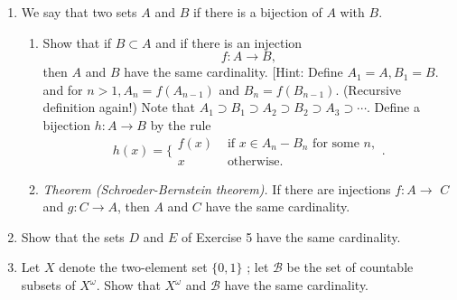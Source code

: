 \begin{enumerate}[itemsep=0.4em, parsep=0pt, topsep=0pt, partopsep=0pt, leftmargin=*, label=\arabic*., ref=\arabic*]
\begin{enumerate}[itemsep=0.2em, parsep=0pt, topsep=0pt, partopsep=0pt, leftmargin=*, label=(\alph*), align=left]
  \item The set \(E\) of all functions \(f : \mathbb{Z}_{+} \rightarrow \{ 0,1\}\).
  \item The set \(F\) of all functions \(f : \mathbb{Z}_{+} \rightarrow \{ 0,1\}\) that are ``.'' [We say that \(f\) is eventually zero if there is a positive integer \(N\) such that \(f(n) = 0\) for all \(n \geq N\). ]
  \item The set \(G\) of all functions \(f : \mathbb{Z}_{+} \rightarrow {\mathbb{Z}}_{+}\) that are eventually 1 .
  \item The set \(H\) of all functions \(f : \mathbb{Z}_{+} \rightarrow {\mathbb{Z}}_{+}\) that are eventually constant.
  \item The set \(I\) of all two-element subsets of \(\mathbb{Z}_{+}\).
  \item The set \(J\) of all finite subsets of \(\mathbb{Z}_{+}\).
  \end{enumerate}
\item We say that two sets \(A\) and \(B\)  if there is a bijection of \(A\) with \(B\).
  \begin{enumerate}[itemsep=0.2em, parsep=0pt, topsep=0pt, partopsep=0pt, leftmargin=*, label=(\alph*), align=left]
  \item Show that if \(B \subset A\) and if there is an injection \[ f : A \rightarrow B, \] then \(A\) and \(B\) have the same cardinality. [Hint: Define \(A_{1} = A,B_{1} = B\). and for \(n > 1,A_{n} = f(A_{n - 1})\) and \(B_{n} = f(B_{n - 1})\). (Recursive definition again!) Note that \(A_{1} \supset {B}_{1} \supset {A}_{2} \supset {B}_{2} \supset {A}_{3} \supset \cdots\). Define a bijection \(h : A \rightarrow B\) by the rule \[ h(x) = \{ \begin{array}{ll} f(x) & \text{ if }x \in {A}_{n} - B_{n}\text{ for some }n, \\ x & \text{ otherwise.} \end{array}. \]
  \item \textsl{Theorem (Schroeder-Bernstein theorem).} If there are injections \(f : A \rightarrow\) \(C\) and \(g : C \rightarrow A\), then \(A\) and \(C\) have the same cardinality.
  \end{enumerate}
\item Show that the sets \(D\) and \(E\) of Exercise 5 have the same cardinality.
\item Let \(X\) denote the two-element set \(\{ 0,1\}\) ; let \(\mathcal{B}\) be the set of countable subsets of \(X^{\omega }\). Show that \(X^{\omega }\) and \(\mathcal{B}\) have the same cardinality.

\end{enumerate}
